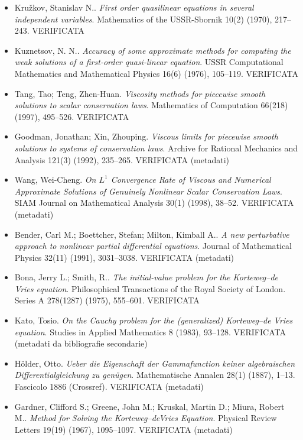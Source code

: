\documentclass[11pt]{article}
\theoremstyle{plain}
\theoremstyle{definition}
\theoremstyle{remark}
\begin{document}
\begin{itemize}[itemsep=2pt,leftmargin=1.2em,font=\small]
\item Kru{\v z}kov, Stanislav N.. \emph{First order quasilinear equations in several independent variables}. Mathematics of the USSR-Sbornik 10(2) (1970), 217--243. \textsf{\footnotesize VERIFICATA}
\item Kuznetsov, N. N.. \emph{Accuracy of some approximate methods for computing the weak solutions of a first-order quasi-linear equation}. USSR Computational Mathematics and Mathematical Physics 16(6) (1976), 105--119. \textsf{\footnotesize VERIFICATA}
\item Tang, Tao; Teng, Zhen-Huan. \emph{Viscosity methods for piecewise smooth solutions to scalar conservation laws}. Mathematics of Computation 66(218) (1997), 495--526. \textsf{\footnotesize VERIFICATA}
\item Goodman, Jonathan; Xin, Zhouping. \emph{Viscous limits for piecewise smooth solutions to systems of conservation laws}. Archive for Rational Mechanics and Analysis 121(3) (1992), 235--265. \textsf{\footnotesize VERIFICATA (metadati)}
\item Wang, Wei-Cheng. \emph{On {$L^1$} Convergence Rate of Viscous and Numerical Approximate Solutions of Genuinely Nonlinear Scalar Conservation Laws}. SIAM Journal on Mathematical Analysis 30(1) (1998), 38--52. \textsf{\footnotesize VERIFICATA (metadati)}
\item Bender, Carl M.; Boettcher, Stefan; Milton, Kimball A.. \emph{A new perturbative approach to nonlinear partial differential equations}. Journal of Mathematical Physics 32(11) (1991), 3031--3038. \textsf{\footnotesize VERIFICATA (metadati)}
\item Bona, Jerry L.; Smith, R.. \emph{The initial-value problem for the {K}orteweg--de {V}ries equation}. Philosophical Transactions of the Royal Society of London. Series A 278(1287) (1975), 555--601. \textsf{\footnotesize VERIFICATA}
\item Kato, Tosio. \emph{On the {C}auchy problem for the (generalized) {K}orteweg--de {V}ries equation}. Studies in Applied Mathematics 8 (1983), 93--128. \textsf{\footnotesize VERIFICATA (metadati da bibliografie secondarie)}
\item H{\"o}lder, Otto. \emph{Ueber die Eigenschaft der Gammafunction keiner algebraischen Differentialgleichung zu gen{\"u}gen}. Mathematische Annalen 28(1) (1887), 1--13. \textsf{\footnotesize Fascicolo 1886 (Crossref). VERIFICATA (metadati)}
\item Gardner, Clifford S.; Greene, John M.; Kruskal, Martin D.; Miura, Robert M.. \emph{Method for Solving the {K}orteweg--de{V}ries Equation}. Physical Review Letters 19(19) (1967), 1095--1097. \textsf{\footnotesize VERIFICATA (metadati)}

\end{itemize}
\end{document}

